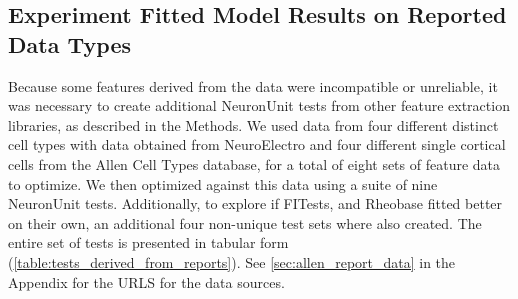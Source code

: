 




%






\subsection{Experiment Fitted Model Results on Reported Data Types} 
Because some features derived from the data were incompatible or unreliable, it was necessary to create additional NeuronUnit tests from other feature extraction libraries, as described in the Methods.
We used data from four different distinct cell types with data obtained from NeuroElectro and four different single cortical cells from the Allen Cell Types database, for a total of eight sets of feature data to optimize.
We then optimized against this data using a suite of nine NeuronUnit tests. Additionally, to explore if FITests, and Rheobase fitted better on their own, an additional four non-unique test sets where also created. The entire set of tests is presented in tabular form (\ref{table:tests_derived_from_reports}). See \ref{sec:allen_report_data} in the Appendix for the URLS for the data sources.

